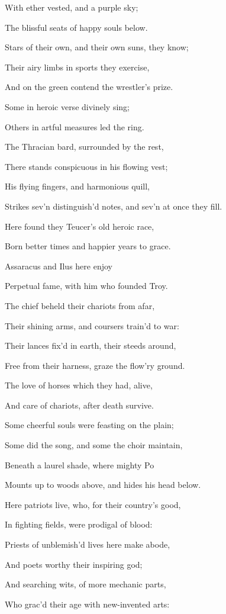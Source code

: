 With ether vested, and a purple sky;

The blissful seats of happy souls below.

Stars of their own, and their own suns, they know;

Their airy limbs in sports they exercise,

And on the green contend the wrestler’s prize.

Some in heroic verse divinely sing;

Others in artful measures led the ring.

The Thracian bard, surrounded by the rest,

There stands conspicuous in his flowing vest;

His flying fingers, and harmonious quill,

Strikes sev’n distinguish’d notes, and sev’n at once they fill.

Here found they Teucer’s old heroic race,

Born better times and happier years to grace.

Assaracus and Ilus here enjoy

Perpetual fame, with him who founded Troy.

The chief beheld their chariots from afar,

Their shining arms, and coursers train’d to war:

Their lances fix’d in earth, their steeds around,

Free from their harness, graze the flow’ry ground.

The love of horses which they had, alive,

And care of chariots, after death survive.

Some cheerful souls were feasting on the plain;

Some did the song, and some the choir maintain,

Beneath a laurel shade, where mighty Po

Mounts up to woods above, and hides his head below.

Here patriots live, who, for their country’s good,

In fighting fields, were prodigal of blood:

Priests of unblemish’d lives here make abode,

And poets worthy their inspiring god;

And searching wits, of more mechanic parts,

Who grac’d their age with new-invented arts:

